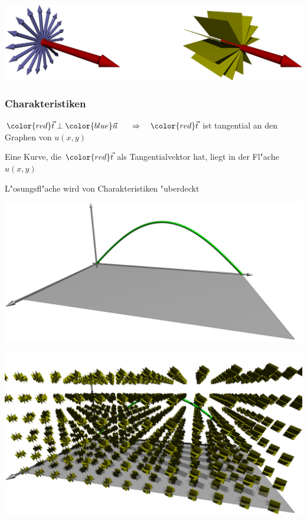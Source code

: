\documentclass{beamer}
\begin{document}
\begin{frame}
\begin{center}
\includegraphics[width=\hsize]{../../skript/3d/normals.jpg}
\end{center}
\end{frame}

\begin{frame}
\frametitle{Charakteristiken}
$
{\color{red}\vec t}
\perp
{\color{blue}\vec n}
$
\pause
$\quad\Rightarrow\quad
\color{red}\vec t$
ist tangential an den Graphen von $u(x,y)$

\bigskip
\pause
Eine Kurve, die $\color{red}\vec t$ als Tangentialvektor hat, 
liegt in der Fl"ache $u(x,y)$

\bigskip
\pause
L"osungsfl"ache wird von {\color{red} Charakteristiken} "uberdeckt

\end{frame}

\begin{frame}
\begin{center}
\includegraphics[width=\hsize]{../../skript/3d/cauchy.jpg}
\end{center}
\end{frame}

\begin{frame}
\begin{center}
\includegraphics[width=\hsize]{../../skript/3d/planes.jpg}
\end{center}
\end{frame}
\end{document}
